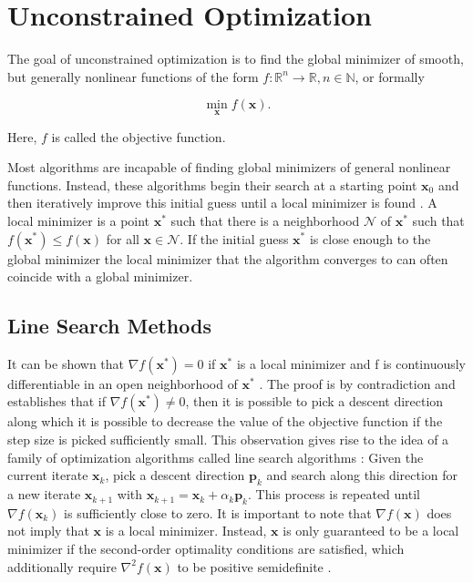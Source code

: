 \section{Unconstrained Optimization}\label{s:unconstrained-optimization}
The goal of unconstrained optimization is to find the global minimizer of smooth, but generally nonlinear functions of the form $f \colon 
\mathbb{R}^n \to \mathbb{R}, n \in \mathbb{N}$, or formally

\[
    \min_{\bm{x}} f(\bm{x}).
\]

\noindent Here, $f$ is called the objective function. 

Most algorithms are incapable of finding global minimizers of general nonlinear functions. 
Instead, these algorithms begin their search at a starting point $\bm{x}_0$ and then iteratively improve this initial guess until a local 
minimizer is found \cite{nocedal2006}. A local minimizer is a point $\bm{x}^*$ such that there is a neighborhood $\mathcal{N}$ of 
$\bm{x}^*$ such that $f(\bm{x}^*) \leq f(\bm{x})$ for all $\bm{x} \in \mathcal{N}$. If the initial guess $\bm{x}^*$ is close enough 
to the global minimizer the local minimizer that the algorithm converges to can often coincide with a global minimizer. 

\subsection{Line Search Methods}\label{ss:line-search}
It can be shown that $\nabla f(\bm{x}^*) = 0$ if $\bm{x}^*$ is a local minimizer and f is continuously differentiable in an open neighborhood
of $\bm{x}^*$ \cite{nocedal2006}. The proof is by contradiction and establishes that if $\nabla f(\bm{x}^*) \neq 0$, then it is possible to pick a descent 
direction along which it is possible to decrease the value of the objective function if the step size is picked sufficiently small. This 
observation gives rise to the idea of a family of optimization algorithms called line search algorithms \cite{nocedal2006}: Given the current 
iterate $\bm{x}_k$, pick a descent direction $\bm{p}_k$ and search along this direction for a new iterate $\bm{x}_{k+1}$ with $\bm{x}_{k+1} = 
\bm{x}_k + \alpha_k \bm{p}_k$. This process is repeated until $\nabla f(\bm{x}_k)$ is sufficiently close to zero. It is important to note that 
$\nabla f(\bm{x})$ does not imply that $\bm{x}$ is a local minimizer. Instead, $\bm{x}$ is only guaranteed to be a local minimizer if the second-order 
optimality conditions are satisfied, which additionally require $\nabla^2 f(\bm{x})$ to be positive semidefinite \cite{nocedal2006}.

